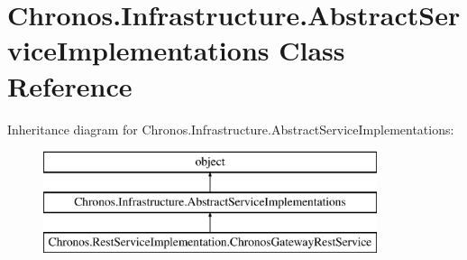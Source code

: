 \hypertarget{classChronos_1_1Infrastructure_1_1AbstractServiceImplementations}{}\section{Chronos.\+Infrastructure.\+Abstract\+Service\+Implementations Class Reference}
\label{classChronos_1_1Infrastructure_1_1AbstractServiceImplementations}
Inheritance diagram for Chronos.\+Infrastructure.\+Abstract\+Service\+Implementations\+:\begin{figure}[H]
\begin{center}
\leavevmode
\includegraphics[height=3.000000cm]{classChronos_1_1Infrastructure_1_1AbstractServiceImplementations}
\end{center}
\end{figure}
